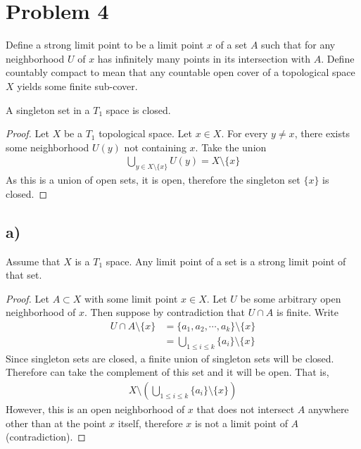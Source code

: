 \documentclass{article}
\theoremstyle{definition}
\begin{document}
\section*{Problem 4}
    Define a strong limit point to be a limit point $x$ of a set $A$ such that for any neighborhood
    $U$ of $x$ has infinitely many points in its intersection with $A$. Define countably compact to
    mean that any countable open cover of a topological space $X$ yields some finite sub-cover.
    \begin{mdframed}
        A singleton set in a $T_1$ space is closed.
    \end{mdframed}
    \begin{proof}
        Let $X$ be a $T_1$ topological space. Let $x \in X$.
        For every $y \neq x$, there exists some neighborhood $U(y)$ not containing $x$.
        Take the union
        \begin{align}
            \bigcup_{y \in X \setminus \{x\}}U(y) = X \setminus \{x\}
        \end{align}
        As this is a union of open sets, it is open, therefore the singleton set $\{x\}$ is closed.
    \end{proof}
    \subsection*{a)}
        \begin{mdframed}
            Assume that $X$ is a $T_1$ space. Any limit point of a set is a strong limit point of
            that set.
        \end{mdframed}
        \begin{proof}
            Let $A \subset X$ with some limit point $x \in X$. Let $U$ be some arbitrary open 
            neighborhood of $x$. Then suppose by contradiction that $U \cap A$ is finite.
            Write
            \begin{align}
                U \cap A \setminus \{x\} &= \{a_1, a_2, \cdots , a_k\} \setminus \{x\}\\
                &= \bigcup_{1 \leqslant i \leqslant k} \{a_i\} \setminus \{x\}
            \end{align}
            Since singleton sets are closed, a finite union of singleton sets will be closed. Therefore
            can take the complement of this set and it will be open. That is,
            \begin{align}
                X \setminus \left(\bigcup_{1 \leqslant i \leqslant k}\{a_i\} \setminus \{x\}\right)
            \end{align}
            However, this is an open neighborhood of $x$ that does not intersect $A$ anywhere other than at
            the point $x$ itself, therefore $x$ is not a limit point of $A$ (contradiction).
        \end{proof}
\end{document}
